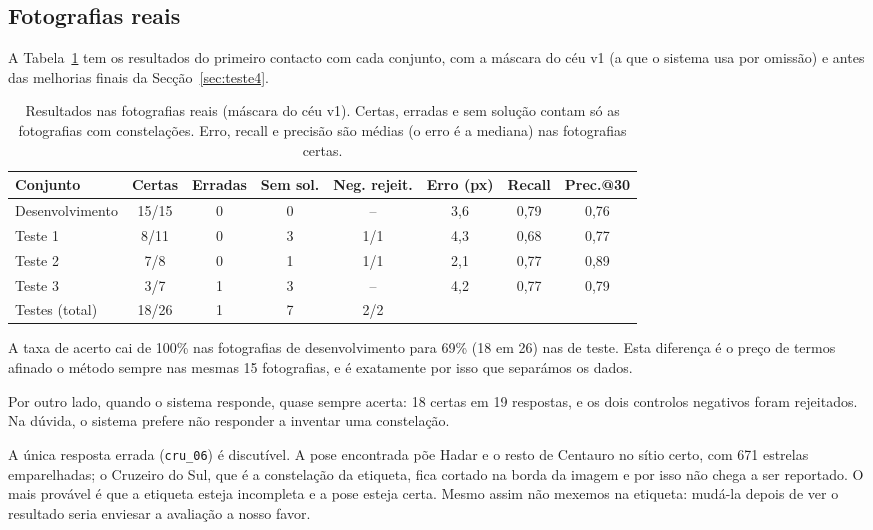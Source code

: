 \documentclass[11pt,a4paper]{article}
\begin{document}
\subsection{Fotografias reais}

A Tabela~\ref{tab:reais} tem os resultados do primeiro contacto com cada
conjunto, com a máscara do céu v1 (a que o sistema usa por omissão) e antes
das melhorias finais da Secção~\ref{sec:teste4}.

\begin{table}[H]
  \centering
  \caption{Resultados nas fotografias reais (máscara do céu v1). Certas,
  erradas e sem solução contam só as fotografias com constelações. Erro,
  recall e precisão são médias (o erro é a mediana) nas fotografias certas.}
  \label{tab:reais}
  \begin{tabular}{@{}lccccccc@{}}
    \toprule
    Conjunto & Certas & Erradas & Sem sol. & Neg. rejeit. & Erro (px) & Recall & Prec.@30 \\
    \midrule
    Desenvolvimento & 15/15 & 0 & 0 & --  & 3,6 & 0,79 & 0,76 \\
    Teste 1         & 8/11  & 0 & 3 & 1/1 & 4,3 & 0,68 & 0,77 \\
    Teste 2         & 7/8   & 0 & 1 & 1/1 & 2,1 & 0,77 & 0,89 \\
    Teste 3         & 3/7   & 1 & 3 & --  & 4,2 & 0,77 & 0,79 \\
    \midrule
    Testes (total)  & 18/26 & 1 & 7 & 2/2 & & & \\
    \bottomrule
  \end{tabular}
\end{table}

A taxa de acerto cai de 100\% nas fotografias de desenvolvimento para 69\%
(18 em 26) nas de teste. Esta diferença é o preço de termos afinado o método
sempre nas mesmas 15 fotografias, e é exatamente por isso que separámos os
dados.

Por outro lado, quando o sistema responde, quase sempre acerta: 18 certas em
19 respostas, e os dois controlos negativos foram rejeitados. Na dúvida, o
sistema prefere não responder a inventar uma constelação.

A única resposta errada (\texttt{cru\_06}) é discutível. A pose encontrada
põe Hadar e o resto de Centauro no sítio certo, com 671 estrelas
emparelhadas; o Cruzeiro do Sul, que é a constelação da etiqueta, fica
cortado na borda da imagem e por isso não chega a ser reportado. O mais
provável é que a etiqueta esteja incompleta e a pose esteja certa. Mesmo
assim não mexemos na etiqueta: mudá-la depois de ver o resultado seria
enviesar a avaliação a nosso favor.
\end{document}
